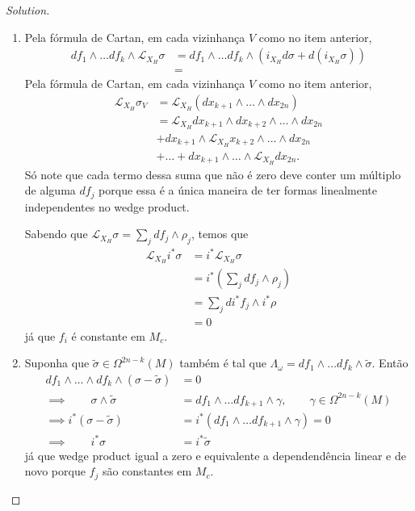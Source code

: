 \begin{proof}[Solution]
\begin{enumerate}[label=\alph*.]
		\item Pela f\'ormula de Cartan, em cada vizinhança $V$ como no item anterior,
			\begin{align*}
				df_1\wedge \ldots df_k\wedge \mathcal{L}_{X_H}\sigma&=df_1\wedge \ldots df_k\wedge \left(i_{X_H}d\sigma+d(i_{X_H}\sigma)\right)\\
				&=
			\end{align*}
Pela f\'ormula de Cartan, em cada vizinhança $V$ como no item anterior,
\begin{align*}
	\mathcal{L}_{X_H}\sigma_V&=\mathcal{L}_{X_H}(dx_{k+1}\wedge \ldots \wedge dx_{2n})\\
	&=\mathcal{L}_{X_H}dx_{k+1}\wedge dx_{k+2}\wedge  \ldots \wedge dx_{2n}\\
	&+dx_{k+1}\wedge \mathcal{L}_{X_H}x_{k+2}\wedge \ldots \wedge dx_{2n}\\
	&+\ldots +dx_{k+1}\wedge \ldots \wedge \mathcal{L}_{X_H}dx_{2n}.
\end{align*}
Só note que cada termo dessa suma que não é zero deve conter um múltiplo de alguma $df_j$ porque essa é a única maneira de ter formas linealmente independentes no wedge product.

		Sabendo que $ \mathcal{L}_{X_H}\sigma=\sum_{j}df_j\wedge \rho_j$, temos que
		\begin{align*}
			\mathcal{L}_{X_H}i^*\sigma&=i^*\mathcal{L}_{X_H}\sigma\\
			&=i^*\left(\sum_{j}df_j\wedge \rho_j\right)\\
			&=\sum_{j}di^*f_j\wedge i^*\rho\\
			&=0
		\end{align*}
		já que $f_i$ é constante em $M_c$.

		\item Suponha que $\tilde{\sigma}\in\Omega^{2n-k}(M)$ também é tal que $\Lambda_\omega =df_1\wedge \ldots df_k\wedge \tilde{ \sigma}$. Então
			\begin{align*}
				df_1\wedge \ldots \wedge df_k\wedge (\sigma-\tilde{\sigma})&=0\\
				\implies \qquad \sigma\wedge \tilde{\sigma}&=df_1\wedge \ldots df_{k+1}\wedge \gamma, \qquad \gamma \in\Omega^{2n-k}(M)\\
				\implies i^*(\sigma-\tilde{\sigma})&=i^*(df_1\wedge \ldots df_{k+1}\wedge \gamma)=0\\
				\implies\qquad  i^*\sigma &=i^*\tilde{\sigma}
			\end{align*}
			já que wedge product igual a zero e equivalente a dependendência linear e de novo porque $f_j$ são constantes em $M_c$.
	\end{enumerate}
\end{proof}

